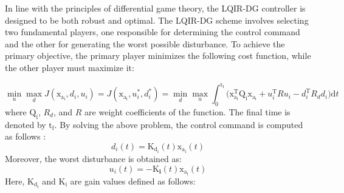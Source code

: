 \documentclass[3p,times]{elsarticle}
\begin{document}
\noindent In line with the principles of differential game theory, the LQIR-DG controller is designed to be both robust and optimal. The LQIR-DG scheme involves selecting two fundamental players, one responsible for determining the control command and the other for generating the worst possible disturbance. To achieve the primary objective, the primary player minimizes the following cost function, while the other player must maximize it:

\begin{equation}
    \min_{u} \max_{d} J(\boldsymbol{\mathrm{x_{a_i}}}, {d_i}, {u_i}) = J(\boldsymbol{\mathrm{x_{a_i}}}, {u^*_i}, {d^*_i})=\min_{d} \max_{u}
     \int_{0}^{\mathrm{t_f}}\biggl (\boldsymbol{\mathrm{x^\mathrm{T}_{a_i}}}  \boldsymbol{\mathrm{Q_i}} \boldsymbol{\mathrm{x_{a_i}}}+
    {{u^\mathrm{T}_i}}  {{R}} {{u_i}}-
    {{d^\mathrm{T}_{i}}} {{ R_{d} d_{i}}}
    \biggl )\mathrm{d}t
\end{equation}
where $\boldsymbol{\mathrm{Q_i}}$, ${{R_{d}}}$, and ${{R}}$ are weight coefficients of the function. The final time is denoted by $\mathrm{t_f}$.
By solving the above problem, the control command is computed as follows \cite{LQDG}:
\begin{equation}
	{{d_i}}(t) =\boldsymbol{{\mathrm{K_{d_i}}}}(t)\boldsymbol{{\mathrm{x_{a_i}}}}(t)
\end{equation}
Moreover, the worst disturbance is obtained as:
\begin{equation}
		{{u_i}}(t) = -\boldsymbol{{\mathrm{K}}_{i}}(t) \boldsymbol{{\mathrm{x_{a_i}}}}(t)
\end{equation}
Here, $\boldsymbol{{\mathrm{K_{d_i}}}}$ and $\boldsymbol{{\mathrm{K_i}}}$ are gain values defined as follows:
\end{document}
